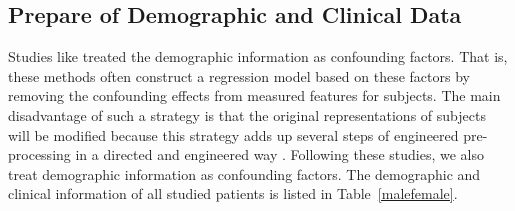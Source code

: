 \documentclass[journal]{IEEEtran}
\begin{document}
\subsection{Prepare of Demographic and Clinical Data}
\label{textdata}
Studies like \cite{dukart2011age, de2016machine} treated the demographic information as confounding factors. That is, these methods often construct a regression model based on these factors by removing the confounding effects from measured features for subjects. The main disadvantage of such a strategy is that the original representations of subjects will be modified because this strategy adds up several steps of engineered pre-processing in a directed and engineered way \cite{liu2018joint}. 
Following these studies, we also treat demographic information as confounding factors. The demographic and clinical information of all studied patients is listed in Table~\ref{malefemale}.
\end{document}
